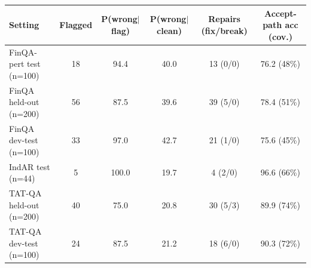 \begin{tabular}{lccccc}
\toprule
Setting & Flagged & P(wrong$\mid$flag) & P(wrong$\mid$clean) & Repairs (fix/break) & Accept-path acc (cov.) \\
\midrule
FinQA-pert test (n=100) & 18 & 94.4 & 40.0 & 13 (0/0) & 76.2 (48\%) \\
FinQA held-out (n=200) & 56 & 87.5 & 39.6 & 39 (5/0) & 78.4 (51\%) \\
FinQA dev-test (n=100) & 33 & 97.0 & 42.7 & 21 (1/0) & 75.6 (45\%) \\
IndAR test (n=44) & 5 & 100.0 & 19.7 & 4 (2/0) & 96.6 (66\%) \\
TAT-QA held-out (n=200) & 40 & 75.0 & 20.8 & 30 (5/3) & 89.9 (74\%) \\
TAT-QA dev-test (n=100) & 24 & 87.5 & 21.2 & 18 (6/0) & 90.3 (72\%) \\
\bottomrule
\end{tabular}
